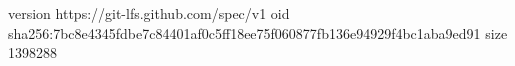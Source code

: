 version https://git-lfs.github.com/spec/v1
oid sha256:7bc8e4345fdbe7c84401af0c5ff18ee75f060877fb136e94929f4bc1aba9ed91
size 1398288
